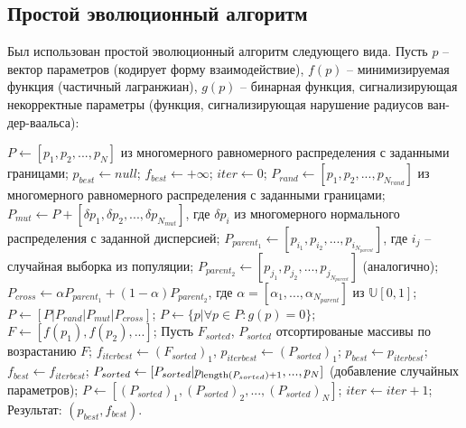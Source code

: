 \subsection{Простой эволюционный алгоритм}
Был использован простой эволюционный алгоритм следующего вида. Пусть $p$ -- вектор параметров (кодирует форму взаимодействие), $f(p)$ -- минимизируемая функция (частичный лагранжиан),
$g(p)$ -- бинарная функция, сигнализирующая некорректные параметры (функция, сигнализирующая нарушение радиусов ван-дер-ваальса):
\begin{algorithm}
\begin{algorithmic}
\State $P \gets [p_1, p_2, ..., p_N]$ из многомерного равномерного распределения с заданными границами;
\State $p_{best} \gets null$;
\State $f_{best} \gets +\infty$;
\State $iter \gets 0$;
	\State $P_{rand} \gets [p_1, p_2, ..., p_{N_{rand}}]$ из многомерного равномерного распределения с заданными границами;
	\State $P_{mut} \gets P + [\delta{}p_1, \delta{}p_2, ..., \delta{}p_{N_{mut}}]$, где $\delta{}p_i$ из многомерного нормального распределения с заданной дисперсией;
	\State $P_{parent_1} \gets [p_{i_1}, p_{i_2}, ..., p_{i_{N_{parent}}}]$, где $i_j$ -- случайная выборка из популяции;
	\State $P_{parent_2} \gets [p_{j_1}, p_{j_2}, ..., p_{j_{N_{parent}}}]$ (аналогично);
	\State $P_{cross} \gets \alpha P_{parent_1} + (1 - \alpha)P_{parent_2}$, где $\alpha = [\alpha_1, ..., \alpha_{N_{parent}}]$ из $\mathbb{U}[0, 1]$;
	\State $P \gets [P | P_{rand} | P_{mut} | P_{cross}]$;
	\State $P \gets \{p | \forall p \in P: g(p) = 0\}$;
	\State $F \gets [f(p_1), f(p_2), ...]$;
	\State Пусть $F_{sorted}$, $P_{sorted}$ отсортированые массивы по возрастанию $F$;
	\State $f_{iterbest} \gets (F_{sorted})_1$, $p_{iterbest} \gets (P_{sorted})_1$;
		\State $p_{best} \gets p_{iterbest}$;
		\State $f_{best} \gets f_{iterbest}$;
	\EndIf
		\State $P_{sorted} \gets [P_{sorted} | p_{\operatorname{length}(P_{sorted})+1}, ..., p_N]$ (добавление случайных параметров); 
	\EndIf
	\State $P \gets [(P_{sorted})_1, (P_{sorted})_2, ..., (P_{sorted})_N]$;
	\State $iter \gets iter+1$;
\EndWhile
\State Результат: $(p_{best}, f_{best})$.
\end{algorithmic}
\end{algorithm}

